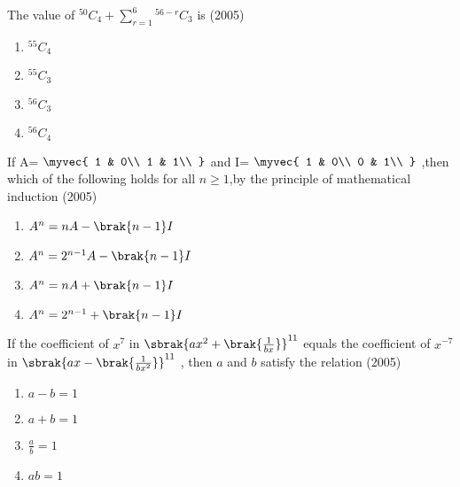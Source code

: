     \item The value of $^{50}C_{4}+\sum_{r=1}^{6}$$^{56-r}C_{3}$ is
        \hfill(2005)
    \begin{enumerate}
        \item$^{55}C_{4}$\\
        \item$^{55}C_{3}$\\
        \item$^{56}C_{3}$\\
        \item$^{56}C_{4}$\\
    \end{enumerate}
    \item If A=
                 $\myvec {
                 1 & 0\\
                 1 & 1\\
                 }$
                       and I=
                          $\myvec{
                          1 & 0\\
                          0 & 1\\
                          }$
                    ,then which of the following holds for all $n\ge1$,by the principle of mathematical induction
                    \hfill(2005)
                    \begin{enumerate}
        \item$A^{n}=nA-\brak{n-1}I$\\
        \item$A^n=2^{n-1}A-\brak{n-1}I$\\
        \item$A^n=nA+\brak{n-1}I$\\
        \item$A^n=2^{n-1}+\brak{n-1}I$\\
    \end{enumerate}
    
    \item If the coefficient of $x^{7}$ in $\sbrak{ax^{2}+\brak{\frac{1}{bx}}}^{11}$ equals the coefficient of $x^{-7}$ in $\sbrak{ax-\brak{\frac{1}{bx^2}}}^{11}$  , then $a$ and $b$ satisfy the relation
       \hfill(2005)
     \begin{enumerate}
        \item $a-b=1$\\
        \item $a+b=1$\\
        \item$\frac{a}{b}=1$\\
        \item $ab=1$\\
    \end{enumerate}

